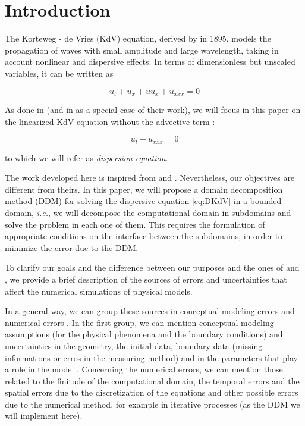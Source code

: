 \section{Introduction}

\indent The Korteweg - de Vries (KdV) equation, derived by \cite{kdv1895} in 1895, models the propagation of waves with small amplitude and large wavelength, taking in account nonlinear and dispersive effects. In terms of dimensionless but unscaled variables, it can be written as \cite{BBM1971}

\begin{equation}
	u_t + u_x + uu_x + u_{xxx} = 0
\end{equation}

\indent As done in \cite{zheng2008} (and in \cite{besse2015} as a special case of their work), we will focus in this paper on the linearized KdV equation without the advective term : 

\begin{equation}
 \label{eq:DKdV}
	u_t  + u_{xxx} = 0
\end{equation}

\noindent to which we will refer as \emph{dispersion equation}.

\indent The work developed here is inspired from \cite{zheng2008} and \cite{besse2015}. Nevertheless, our objectives are different from theirs. In this paper, we will propose a domain decomposition method (DDM) for solving the dispersive equation \ref{eq:DKdV} in a bounded domain, \emph{i.e.}, we will decompose the computational domain in subdomains and solve the problem in each one of them. This requires the formulation of appropriate conditions on the interface between the subdomains, in order to minimize the error due to the DDM.

\indent To clarify our goals and the difference between our purposes and the ones of \cite{zheng2008} and \cite{besse2015}, we provide a brief description of the sources of errors and uncertainties that affect the numerical simulations of physical models.

\indent In a general way, we can group these sources in conceptual modeling errors and numerical errors \cite{roache1997}. In the first group, we can mention conceptual modeling assumptions (for the physical phenomena and the boundary conditions) and uncertainties in the geometry, the initial data, boundary data (missing informations or erros in the measuring method) and in the parameters that play a role in the model \cite{roache1997,balagurusamy2008}. Concerning the numerical errors, we can mention those related to the finitude of the computational domain, the temporal errors and the spatial errors due to the discretization of the equations  \cite{karniadakis1995,roache1997} and other possible errors due to the numerical method, for example in iterative processes (as the DDM we will implement here).

